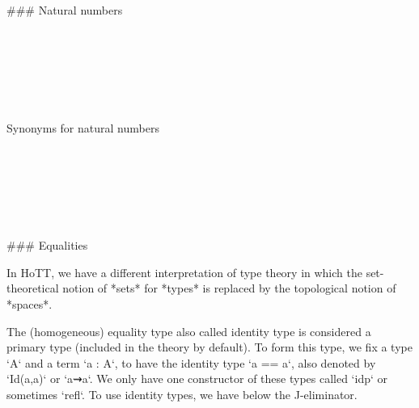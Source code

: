 ### Natural numbers

\begin{code}%
\>[0]\<%
\\
\>[0][@{}l@{\AgdaIndent{0}}]%
\>[2]\<%
\\
\>[2][@{}l@{\AgdaIndent{0}}]%
\>[4]\AgdaSymbol{:}\AgdaSpace{}%
\<%
\\
%
\>[2]\<%
\\
%
\>[2]\AgdaSpace{}%
\AgdaSymbol{:}\AgdaSpace{}%
\<%
\\
%
\>[2]\AgdaSpace{}%
\AgdaSymbol{:}\AgdaSpace{}%
\AgdaSpace{}%
\AgdaSpace{}%
\<%
\end{code}

Synonyms for natural numbers

\begin{code}%
\>[0]\AgdaSpace{}%
\AgdaSymbol{=}\AgdaSpace{}%
\<%
\\
%
\\[\AgdaEmptyExtraSkip]%
\>[0]\AgdaSpace{}%
%
\>[12]\AgdaSymbol{=}\AgdaSpace{}%
\<%
\\
\>[0]\AgdaSpace{}%
\AgdaSpace{}%
\AgdaSymbol{=}\AgdaSpace{}%
\<%
\\
%
\\[\AgdaEmptyExtraSkip]%
\>[0]\AgdaSymbol{\{-\#}\AgdaSpace{}%
\AgdaSpace{}%
\AgdaSpace{}%
\AgdaSpace{}%
\AgdaSymbol{\#-\}}\<%
\end{code}

### Equalities

In HoTT, we have a different interpretation of type theory in which the
set-theoretical notion of *sets* for *types* is replaced by the topological
notion of *spaces*.

The (homogeneous) equality type also called identity type is considered a primary type
(included in the theory by default). To form this type, we fix a type `A` and a
term `a : A`, to have the identity type `a == a`, also denoted by `Id(a,a)` or
`a⇝a`. We only have one constructor of these types called `idp` or sometimes
`refl`. To use identity types, we have below the J-eliminator.

